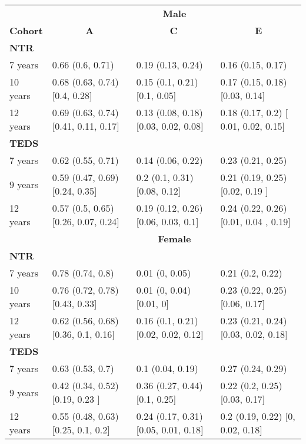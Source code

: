 \begin{tabular}{llll}
\hline
      & \multicolumn{3}{c}{\textbf{Male}} \\
\cline{2-4}\multicolumn{1}{c}{\textbf{Cohort}} & \multicolumn{1}{c}{\textbf{A}} & \multicolumn{1}{c}{\textbf{C}} & \multicolumn{1}{c}{\textbf{E}} \\
\hline
\multicolumn{4}{l}{\textbf{NTR}} \\
7 years & 0.66 (0.6, 0.71)  & 0.19 (0.13, 0.24)  & 0.16 (0.15, 0.17)  \\
10 years & 0.68 (0.63, 0.74)     [0.4, 0.28] & 0.15 (0.1, 0.21) [0.1, 0.05] & 0.17 (0.15, 0.18) [0.03, 0.14] \\
12 years & 0.69 (0.63, 0.74) [0.41, 0.11, 0.17] & 0.13 (0.08, 0.18) [0.03, 0.02, 0.08] & 0.18 (0.17, 0.2) [ 0.01, 0.02, 0.15] \\
\multicolumn{4}{l}{\textbf{TEDS}} \\
7 years & 0.62 (0.55, 0.71)  & 0.14 (0.06, 0.22) & 0.23 (0.21, 0.25) \\
9 years & 0.59 (0.47, 0.69) [0.24, 0.35] & 0.2 (0.1, 0.31) [0.08, 0.12] & 0.21 (0.19, 0.25) [0.02, 0.19 ] \\
12 years & 0.57 (0.5, 0.65) [0.26, 0.07, 0.24] & 0.19 (0.12, 0.26) [0.06, 0.03, 0.1] & 0.24 (0.22, 0.26) [0.01, 0.04 , 0.19] \\
\hline
& \multicolumn{3}{c}{\textbf{Female}} \\
\hline
\multicolumn{4}{l}{\textbf{NTR}} \\
\hline
7 years & 0.78 (0.74, 0.8)  & 0.01 (0, 0.05)  & 0.21 (0.2, 0.22)  \\
10 years & 0.76 (0.72, 0.78) [0.43, 0.33] & 0.01 (0, 0.04) [0.01, 0] & 0.23 (0.22, 0.25) [0.06, 0.17] \\
12 years & 0.62 (0.56, 0.68) [0.36, 0.1, 0.16] & 0.16 (0.1, 0.21) [0.02, 0.02, 0.12] & 0.23 (0.21, 0.24) [0.03, 0.02, 0.18] \\
\multicolumn{4}{l}{\textbf{TEDS}} \\
7 years & 0.63 (0.53, 0.7) & 0.1 (0.04, 0.19) & 0.27 (0.24, 0.29) \\
9 years & 0.42 (0.34, 0.52) [0.19, 0.23 ] & 0.36 (0.27, 0.44) [0.1, 0.25] & 0.22 (0.2, 0.25) [0.03, 0.17] \\
12 years & 0.55 (0.48, 0.63) [0.25, 0.1, 0.2] & 0.24 (0.17, 0.31) [0.05, 0.01, 0.18] & 0.2 (0.19, 0.22)  [0, 0.02, 0.18] \\
\hline
\end{tabular}

